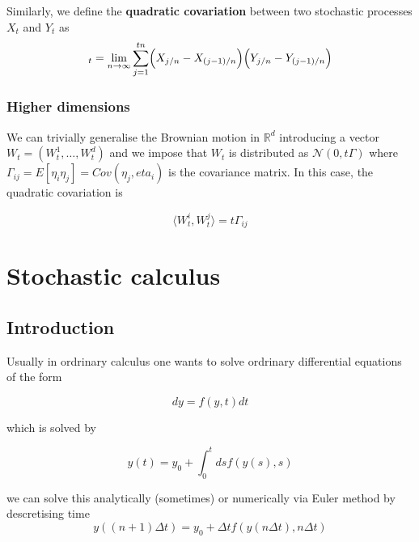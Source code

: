 \documentclass[11pt,a4paper]{article}
\begin{document}
Similarly, we define the \textbf{quadratic covariation} between two stochastic processes $X_t$ and $Y_t$ as
\begin{equation}
    [X,Y]_t = \lim_{n \to \infty} \sum_{j=1}^{tn}\Bigl(X_{j/n}-X_{(j-1)/n} \Bigl)\Bigl(Y_{j/n}-Y_{(j-1)/n} \Bigl) 
\end{equation}

\subsubsection{Higher dimensions}

We can trivially generalise the Brownian motion in $\mathbb{R}^d$ introducing a vector $W_t = (W^{1}_t,\dots, W^{d}_{t})$ and we impose that $W_t$ is distributed as $\mathcal{N}(0,t \Gamma)$ where $\Gamma_{ij} = E[\eta_i\eta_j] = Cov(\eta_j,eta_i)$ is the covariance matrix. In this case, the quadratic covariation is 

\begin{equation}
    \langle W^{i}_t,W^{j}_t\rangle = t\Gamma_{ij}
\end{equation}







\section{Stochastic calculus}

\subsection{Introduction}

Usually in ordrinary calculus one wants to solve ordrinary differential equations of the form 

\begin{equation}
    dy = f(y,t)dt
\end{equation}

which is solved by

\begin{equation}
    y(t) = y_0 + \int_{0}^{t}ds f(y(s),s)
\end{equation}

we can solve this analytically (sometimes) or numerically via Euler method by descretising time
\begin{equation}
    y((n+1)\Delta t) = y_0 + \Delta t f(y(n \Delta t), n\Delta t)
\end{equation}
\end{document}
